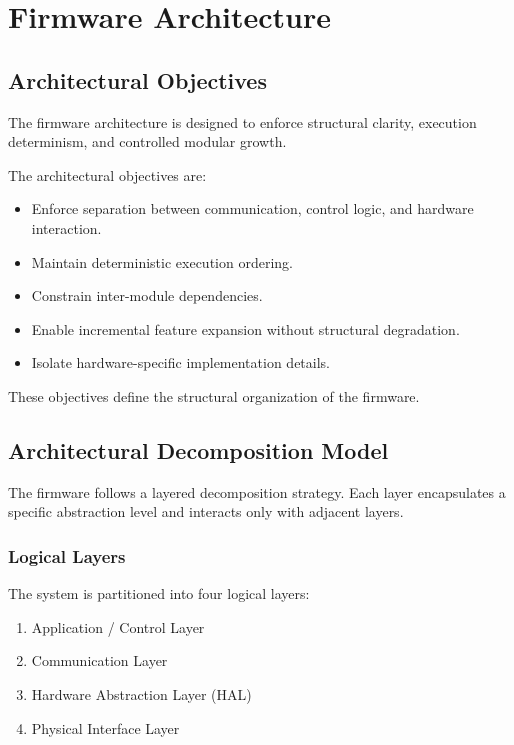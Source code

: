 \chapter{Firmware Architecture}

\section{Architectural Objectives}

The firmware architecture is designed to enforce structural clarity, execution determinism, and controlled modular growth.

The architectural objectives are:

\begin{itemize}
	\item Enforce separation between communication, control logic, and hardware interaction.
	\item Maintain deterministic execution ordering.
	\item Constrain inter-module dependencies.
	\item Enable incremental feature expansion without structural degradation.
	\item Isolate hardware-specific implementation details.
\end{itemize}

These objectives define the structural organization of the firmware.


\section{Architectural Decomposition Model}

The firmware follows a layered decomposition strategy. Each layer encapsulates a specific abstraction level and interacts only with adjacent layers.

\subsection{Logical Layers}

The system is partitioned into four logical layers:

\begin{enumerate}
	\item Application / Control Layer
	\item Communication Layer
	\item Hardware Abstraction Layer (HAL)
	\item Physical Interface Layer
\end{enumerate}

